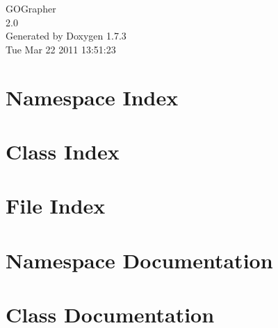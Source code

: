\documentclass[a4paper]{book}
\begin{document}
\hypersetup{pageanchor=false}
\begin{titlepage}
\vspace*{7cm}
\begin{center}
{\Large GOGrapher \\[1ex]\large 2.0 }\\
\vspace*{1cm}
{\large Generated by Doxygen 1.7.3}\\
\vspace*{0.5cm}
{\small Tue Mar 22 2011 13:51:23}\\
\end{center}
\end{titlepage}
\clearemptydoublepage
{}
\tableofcontents
\clearemptydoublepage
{}
\hypersetup{pageanchor=true}
\chapter{Namespace Index}

\chapter{Class Index}

\chapter{File Index}

\chapter{Namespace Documentation}
















\chapter{Class Documentation}










\end{document}
